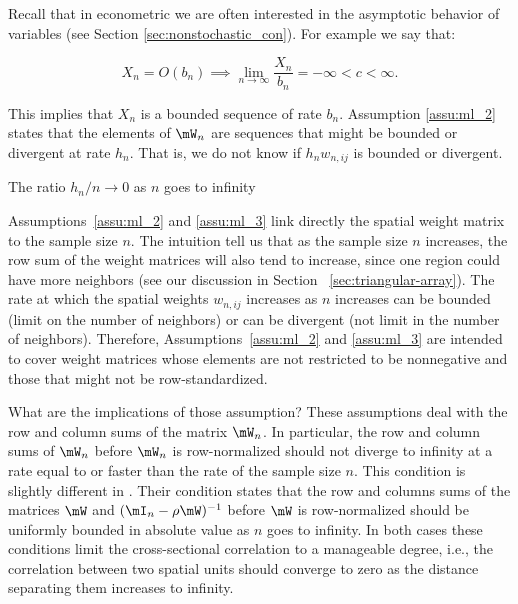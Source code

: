 \documentclass[english,12pt]{book}\usepackage[]{graphicx}\usepackage[]{xcolor}
\begin{document}
Recall that in econometric we are often interested in the asymptotic behavior of variables (see Section \ref{sec:nonstochastic_con}). For example we say that:

\begin{equation*}
  X_n = O(b_n) \implies \lim_{n\to \infty}\frac{X_n}{b_n} = -\infty < c < \infty.
\end{equation*}

This implies that $X_n$ is a bounded sequence of rate $b_n$. Assumption \ref{assu:ml_2} states that the elements of $\mW_{n}$ are sequences that might be bounded or divergent at rate $h_n$. That is, we do not know if $h_nw_{n,ij}$ is bounded or divergent.

\begin{assumption}\label{assu:ml_3}
	The ratio $h_n/n \to 0$ as $n$ goes to infinity
\end{assumption}

Assumptions~\ref{assu:ml_2} and \ref{assu:ml_3} link directly the spatial weight matrix to the sample size $n$. The intuition tell us that as the sample size $n$ increases, the row sum of the weight matrices will also tend to increase, since one region could have more neighbors (see our discussion in Section ~\ref{sec:triangular-array}). The rate at which the spatial weights $w_{n,ij}$ increases as $n$ increases can be bounded (limit on the number of neighbors) or can be divergent (not limit in the number of neighbors). Therefore, Assumptions~\ref{assu:ml_2} and \ref{assu:ml_3} are intended to cover weight matrices whose elements are not restricted to be nonnegative and those that might not be row-standardized. 

What are the implications of those assumption? These assumptions deal with the row and column sums of the matrix $\mW_n$. In particular, the row and column sums of $\mW_n$ before $\mW_n$ is row-normalized should not diverge to infinity at a rate equal to or faster than the rate of the sample size $n$. This condition is slightly different in \cite{kelejian1998generalized, kelejian1999generalized}. Their condition states that the row and columns sums of the matrices $\mW$ and $(\mI_n - \rho\mW)^{-1}$ before $\mW$ is row-normalized should be uniformly bounded in absolute value as $n$ goes to infinity. In both cases these conditions limit the cross-sectional correlation to a manageable degree, i.e., the correlation between two spatial units should converge to zero as the distance separating them increases to infinity. 
\end{document}
